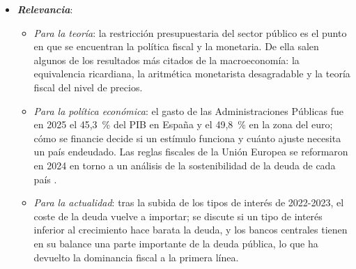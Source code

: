 \documentclass[11pt]{article}
\begin{document}
\begin{itemize}
\item \textbf{\emph{Relevancia}}:
  \begin{itemize}
  \item \emph{Para la teoría}: la restricción presupuestaria del sector público es el punto en que se encuentran la política fiscal y la monetaria. De ella salen algunos de los resultados más citados de la macroeconomía: la equivalencia ricardiana, la aritmética monetarista desagradable y la teoría fiscal del nivel de precios.
  \item \emph{Para la política económica}: el gasto de las Administraciones Públicas fue en 2025 el 45,3~\% del PIB en España y el 49,8~\% en la zona del euro\nocite{Eurostat2026GovMain}; cómo se financie decide si un estímulo funciona y cuánto ajuste necesita un país endeudado. Las reglas fiscales de la Unión Europea se reformaron en 2024 en torno a un análisis de la sostenibilidad de la deuda de cada país\nocite{UE2024Reglamento1263} .
  \item \emph{Para la actualidad}: tras la subida de los tipos de interés de 2022-2023, el coste de la deuda vuelve a importar; se discute si un tipo de interés inferior al crecimiento hace barata la deuda\nocite{Blanchard2019Deuda}, y los bancos centrales tienen en su balance una parte importante de la deuda pública, lo que ha devuelto la dominancia fiscal a la primera línea.
  \end{itemize}


\end{itemize}
\end{document}
